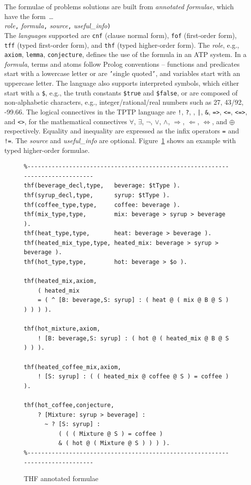 \documentclass{easychair}
\newcommand{\smalltt}[1]{\small \texttt{#1}}
\begin{document}
The formulae of problems solutions are built from {\em annotated formulae}, 
which have the form~\ldots \\
{\em role}{\tt ,}
{\em formula}{\tt ,}
{\em source}{\tt ,}
{\em useful\_info}{\tt )}\\
The {\em language}s supported are {\smalltt{cnf}} (clause normal form), {\smalltt{fof}}
(first-order form), {\smalltt{tff}} (typed first-order form), and {\smalltt{thf}}
(typed higher-order form).
The {\em role}, e.g., {\smalltt{axiom}}, {\smalltt{lemma}}, {\smalltt{conjecture}}, defines the 
use of the formula in an ATP system.
In a {\em formula}, terms and atoms follow Prolog conventions -- functions and predicates start 
with a lowercase letter or are {\tt '}single quoted{\tt '}, and variables start with an uppercase 
letter.
The language also supports interpreted symbols, which either start with a {\tt \$}, e.g., the 
truth constants {\smalltt{\$true}} and {\smalltt{\$false}}, or are composed of 
non-alphabetic characters, e.g., integer/rational/real numbers such as 27, 43/92, -99.66.
The logical connectives in the TPTP language are
{\tt !}, {\tt ?}, {\tt {\raisebox{0.4ex}{\texttildelow}}}, {\tt |}, {\tt \&}, {\tt =>}, {\tt <=},
{\tt <=>}, and {\tt <{\raisebox{0.4ex}{\texttildelow}}>},
for the mathematical connectives
$\forall$, $\exists$, $\neg$, $\vee$, $\wedge$, $\Rightarrow$, $\Leftarrow$, $\Leftrightarrow$, 
and $\oplus$ respectively.
Equality and inequality are expressed as the infix operators {\tt =} and {\tt !=}.
The {\em source} and {\em useful\_info} are optional.
Figure~\ref{ExampleFormula} shows an example with typed higher-order formulae.

\begin{figure}[htb]
{\footnotesize
{\setlength{\baselineskip}{3mm}
\begin{verbatim}
%------------------------------------------------------------------------------
thf(beverage_decl,type,   beverage: $tType ).
thf(syrup_decl,type,      syrup: $tType ).
thf(coffee_type,type,     coffee: beverage ).
thf(mix_type,type,        mix: beverage > syrup > beverage ).
thf(heat_type,type,       heat: beverage > beverage ).
thf(heated_mix_type,type, heated_mix: beverage > syrup > beverage ).
thf(hot_type,type,        hot: beverage > $o ).

thf(heated_mix,axiom,
    ( heated_mix
    = ( ^ [B: beverage,S: syrup] : ( heat @ ( mix @ B @ S ) ) ) ) ).

thf(hot_mixture,axiom,
    ! [B: beverage,S: syrup] : ( hot @ ( heated_mix @ B @ S ) ) ).

thf(heated_coffee_mix,axiom,
    ! [S: syrup] : ( ( heated_mix @ coffee @ S ) = coffee ) ).

thf(hot_coffee,conjecture,
    ? [Mixture: syrup > beverage] :
      ~ ? [S: syrup] :
          ( ( ( Mixture @ S ) = coffee )
          & ( hot @ ( Mixture @ S ) ) ) ).
%------------------------------------------------------------------------------
\end{verbatim}
}}
\caption{THF annotated formulae}
\label{ExampleFormula}
\end{figure}
\end{document}
